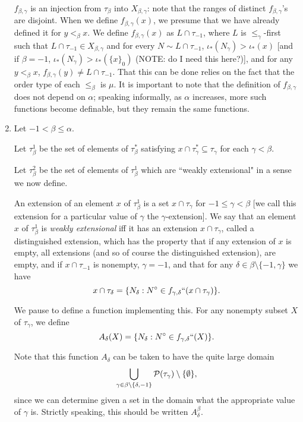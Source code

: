 \documentclass[12pt]{article}
\begin{document}
\begin{enumerate}
 $f_{\beta,\gamma}$ is an injection from $\tau_\beta$ into $X_{\beta,\gamma}$:  note that the ranges of distinct $f_{\beta,\gamma}$'s are disjoint.
When we define $f_{\beta,\gamma}(x)$, we presume that we have already defined it for $y <_\beta x$.
We define $f_{\beta,\gamma}(x)$ as $L\cap \tau_{-1}$, where $L$ is $\leq _\gamma$-first such that $L\cap \tau_{-1} \in X_{\beta,\gamma}$ and for every $N \sim L \cap \tau_{-1}$, $\iota_*(N_\gamma)>\iota_*(x)$ [and if $\beta=-1$, $\iota_*(N_\gamma)>\iota_*(\{x\}_0)$ (NOTE:  do I need this here?)], and for any $y<_\beta x$, $f_{\beta,\gamma}(y) \neq L\cap \tau_{-1}$.  That this can be done relies on the fact that the order type of each $\leq_\beta$ is $\mu$.  It is important to note that the definition of $f_{\beta,\gamma}$ does not depend on $\alpha$; speaking informally, as $\alpha$ increases, more such functions become definable, but they remain the same functions.

\item Let $-1<\beta\leq \alpha$.


Let $\tau_\beta^1$ be the set of elements of $\tau_\beta^*$ satisfying $x \cap \tau^*_\gamma \subseteq \tau_\gamma$ for each $\gamma<\beta$.

Let $\tau_\beta^2$ be the set of elements of $\tau_\beta^1$ which are ``weakly extensional" in a sense we now define.

 An extension of an element $x$ of $\tau_\beta^1$ is a set $x \cap \tau_\gamma$ for $-1 \leq \gamma <\beta$ [we call this extension for a particular value of $\gamma$ the $\gamma$-extension].  We say that an element $x$ of  $\tau_\beta^1$ is {\em weakly extensional\/}
iff it has an extension $x \cap \tau_\gamma$, called a distinguished extension, which has the property that if any extension of $x$ is empty, all extensions (and so of course the distinguished extension), are empty,  and if $x \cap \tau_{-1}$ is nonempty, $\gamma = -1$, and that for any $\delta \in \beta \setminus \{-1,\gamma\}$ we have $$x \cap \tau_\delta = \{N_\delta:N^\circ \in f_{\gamma,\delta}``(x \cap \tau_\gamma)\}.$$

We pause to define a function implementing this.  For any nonempty subset $X$ of $\tau_\gamma$, we define $$A_\delta(X) =  \{N_\delta:N^\circ \in f_{\gamma,\delta}``(X)\}.$$

Note that this function $A_\delta$ can be taken to have the quite large domain $$\bigcup_{\gamma \in \beta \setminus \{\delta,-1\}} {\cal P}(\tau_\gamma) \setminus \{\emptyset\},$$ since we can determine given a set in the domain what the appropriate value of $\gamma$ is.
Strictly speaking, this should be written $A^{\beta}_{\delta}$.


\end{enumerate}
\end{document}
